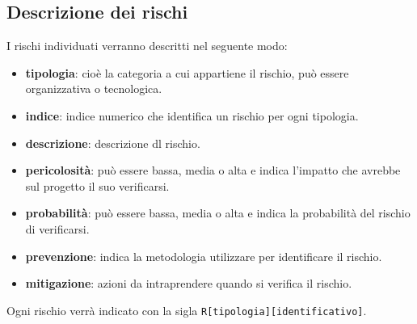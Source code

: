 \subsection{Descrizione dei rischi}
I rischi individuati verranno descritti nel seguente modo:
\begin{itemize}
    \item \textbf{tipologia}: cioè la categoria a cui appartiene il rischio, può essere organizzativa o tecnologica.
    \item \textbf{indice}: indice numerico che identifica un rischio per ogni tipologia.
    \item \textbf{descrizione}: descrizione dl rischio.
    \item \textbf{pericolosità}: può essere bassa, media o alta e indica l'impatto che avrebbe sul progetto il suo verificarsi.
    \item \textbf{probabilità}: può essere bassa, media o alta e indica la probabilità del rischio di verificarsi.
    \item \textbf{prevenzione}: indica la metodologia utilizzare per identificare il rischio.
    \item \textbf{mitigazione}: azioni da intraprendere quando si verifica il rischio.   
\end{itemize}
Ogni rischio verrà indicato con la sigla \texttt{R[tipologia][identificativo]}.